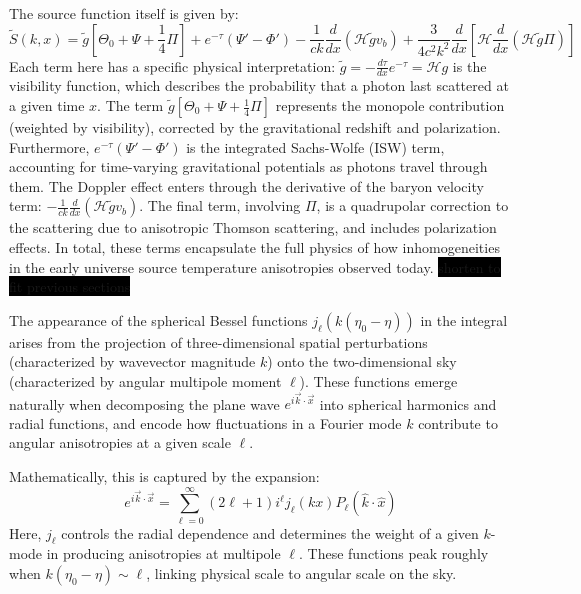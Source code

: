 \documentclass{aa}
\numberwithin{equation}{section}
\numberwithin{table}{section}
\numberwithin{figure}{section}
\begin{document}
The source function itself is given by:
\begin{equation}
\tilde{S}(k, x) = \tilde{g} \left[ \Theta_0 + \Psi + \frac{1}{4} \Pi \right] + e^{-\tau} (\Psi' - \Phi') - \frac{1}{ck} \frac{d}{dx}(\mathcal{H} \tilde{g} v_b) + \frac{3}{4 c^2 k^2} \frac{d}{dx} \left[ \mathcal{H} \frac{d}{dx} (\mathcal{H} \tilde{g} \Pi) \right]
\end{equation}
Each term here has a specific physical interpretation: $\tilde{g} = -\frac{d\tau}{dx} e^{-\tau} = \mathcal{H} g$ is the visibility function, which describes the probability that a photon last scattered at a given time $x$. The term $\tilde{g}[\Theta_0 + \Psi + \frac{1}{4} \Pi]$ represents the monopole contribution (weighted by visibility), corrected by the gravitational redshift and polarization. Furthermore, $e^{-\tau}(\Psi' - \Phi')$ is the integrated Sachs-Wolfe (ISW) term, accounting for time-varying gravitational potentials as photons travel through them. The Doppler effect enters through the derivative of the baryon velocity term: $-\frac{1}{ck} \frac{d}{dx}(\mathcal{H} \tilde{g} v_b)$. The final term, involving $\Pi$, is a quadrupolar correction to the scattering due to anisotropic Thomson scattering, and includes polarization effects. In total, these terms encapsulate the full physics of how inhomogeneities in the early universe source temperature anisotropies observed today. \colorbox{black}{shorten to fit previous sections}

The appearance of the spherical Bessel functions $j_\ell(k(\eta_0 - \eta))$ in the integral arises from the projection of three-dimensional spatial perturbations (characterized by wavevector magnitude $k$) onto the two-dimensional sky (characterized by angular multipole moment $\ell$). These functions emerge naturally when decomposing the plane wave $e^{i \vec{k} \cdot \vec{x}}$ into spherical harmonics and radial functions, and encode how fluctuations in a Fourier mode $k$ contribute to angular anisotropies at a given scale $\ell$.

Mathematically, this is captured by the expansion:
\begin{equation}
e^{i \vec{k} \cdot \vec{x}} = \sum_{\ell=0}^{\infty} (2\ell+1)i^\ell j_\ell(kx) P_\ell(\hat{k} \cdot \hat{x})
\end{equation}
Here, $j_\ell$ controls the radial dependence and determines the weight of a given $k$-mode in producing anisotropies at multipole $\ell$. These functions peak roughly when $k(\eta_0 - \eta) \sim \ell$, linking physical scale to angular scale on the sky.
\end{document}
